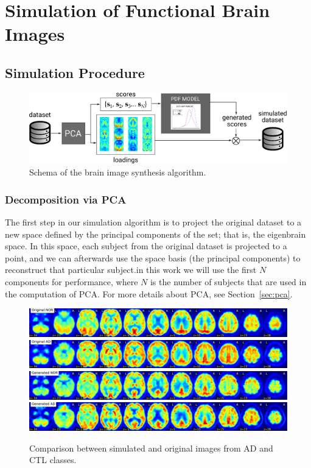 \chapter{Simulation of Functional Brain Images}\label{ch:simulation}
\section{Simulation Procedure}

\begin{figure}[htp]
	\centering
	\includegraphics[width=\textwidth]{gfx/ch9/SchemaGeneration}
	\caption{Schema of the brain image synthesis algorithm.}
	\label{fig:simulationSchema}
\end{figure}
\subsection{Decomposition via PCA}
The first step in our simulation algorithm is to project the original dataset to a new space defined by the principal components of the set; that is, the eigenbrain space. In this space, each subject from the original dataset is projected to a point, and we can afterwards use the space basis (the principal components) to reconstruct that particular subject.in this work we will use the first $N$ components for performance, where $N$ is the number of subjects that are used in the computation of \ac{PCA}. For more details about \ac{PCA}, see Section~\ref{sec:pca}. 

\begin{figure}[!h]
	\centering
	\includegraphics[width=0.7\linewidth]{gfx/ch9/originalNOR}\\
	\includegraphics[width=0.7\linewidth]{gfx/ch9/originalAD}\\
	\includegraphics[width=0.7\linewidth]{gfx/ch9/generatedNOR}\\
	\includegraphics[width=0.7\linewidth]{gfx/ch9/generatedAD}
	\caption{Comparison between simulated and original images from \ac{AD} and \ac{CTL} classes.}
	\label{fig:comparisonSimulation}
\end{figure}


